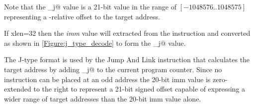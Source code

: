 Note that the \verb@imm_j@ value is 
a 21-bit value in the range of 
$[-1048576..1048575]$ representing a \verb@pc@-relative offset to the 
target address. 




If \Gls{xlen}=32 then the {\em imm} value will extracted from the 
instruction and converted as shown in \autoref{Figure:j_type_decode} to
form the \verb@imm_j@ value.

\begin{figure}[ht]
\centering
\DrawInsnOpJTypeDecoding
{}
\label{Figure:j_type_decode}
\label{imm.j:decode}
\end{figure}


%
%
%
%

The J-type format is used by the Jump And Link instruction that calculates 
the target address by adding \verb@imm_j@ to the current program 
counter.  Since no instruction can be placed at an odd address the 20-bit 
imm value is zero-extended to the right to represent a 21-bit signed offset 
capable of expressing a wider range of target addresses than the 20-bit 
imm value alone.

